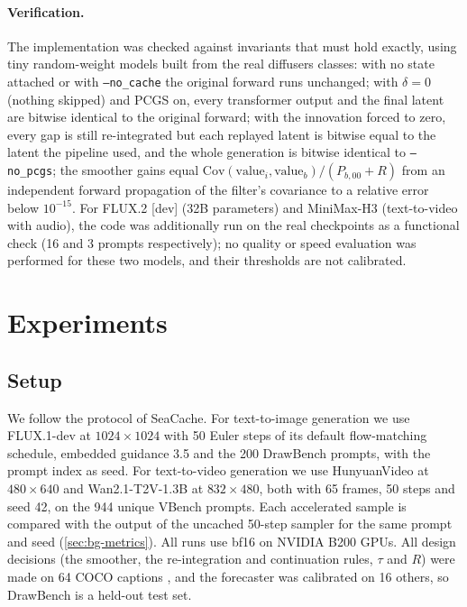 \paragraph{Verification.} The implementation was checked against invariants that must hold exactly, using tiny random-weight models built from the real diffusers classes: with no state attached or with \texttt{--no\_cache} the original forward runs unchanged; with $\delta=0$ (nothing skipped) and PCGS on, every transformer output and the final latent are bitwise identical to the original forward; with the innovation forced to zero, every gap is still re-integrated but each replayed latent is bitwise equal to the latent the pipeline used, and the whole generation is bitwise identical to \texttt{--no\_pcgs}; the smoother gains equal $\mathrm{Cov}(\text{value}_i,\text{value}_b)/(P_{b,00}+R)$ from an independent forward propagation of the filter's covariance to a relative error below $10^{-15}$. For FLUX.2 [dev] (32B parameters) and MiniMax-H3 (text-to-video with audio), the code was additionally run on the real checkpoints as a functional check (16 and 3 prompts respectively); no quality or speed evaluation was performed for these two models, and their thresholds are not calibrated.

\section{Experiments}\label{sec:kalsea-exp}

\subsection{Setup}
We follow the protocol of SeaCache. For text-to-image generation we use FLUX.1-dev at $1024\times1024$ with 50 Euler steps of its default flow-matching schedule, embedded guidance 3.5 and the 200 DrawBench prompts, with the prompt index as seed. For text-to-video generation we use HunyuanVideo at $480\times640$ and Wan2.1-T2V-1.3B at $832\times480$, both with 65 frames, 50 steps and seed 42, on the 944 unique VBench prompts. Each accelerated sample is compared with the output of the uncached 50-step sampler for the same prompt and seed (\cref{sec:bg-metrics}). All runs use bf16 on NVIDIA B200 GPUs. All design decisions (the smoother, the re-integration and continuation rules, $\tau$ and $R$) were made on 64 COCO captions \citep{lin2014coco}, and the forecaster was calibrated on 16 others, so DrawBench is a held-out test set.

